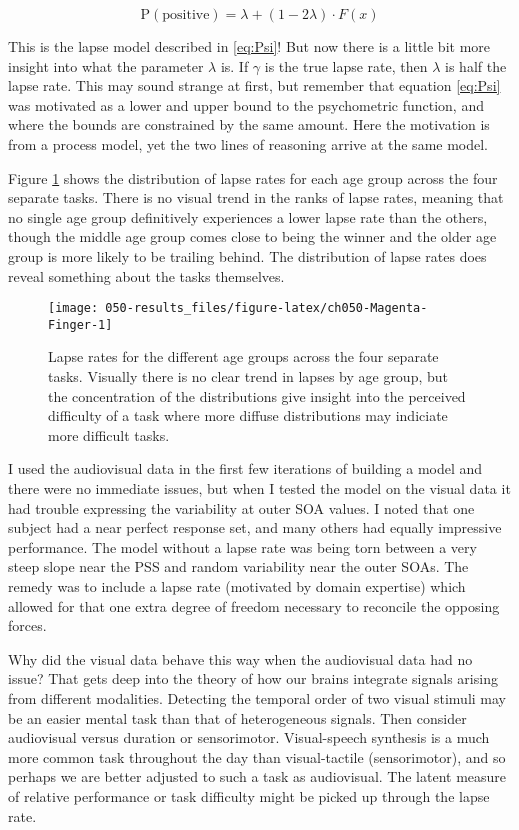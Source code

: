 \documentclass[11pt, oneside, openany]{scrbook}
\begin{document}
\[
\mathrm{P}(\textrm{positive}) = \lambda + (1 - 2\lambda) \cdot F(x)
\]

This is the lapse model described in \eqref{eq:Psi}! But now there is a little bit more insight into what the parameter \(\lambda\) is. If \(\gamma\) is the true lapse rate, then \(\lambda\) is half the lapse rate. This may sound strange at first, but remember that equation \eqref{eq:Psi} was motivated as a lower and upper bound to the psychometric function, and where the bounds are constrained by the same amount. Here the motivation is from a process model, yet the two lines of reasoning arrive at the same model.

Figure \ref{fig:ch050-Magenta-Finger} shows the distribution of lapse rates for each age group across the four separate tasks. There is no visual trend in the ranks of lapse rates, meaning that no single age group definitively experiences a lower lapse rate than the others, though the middle age group comes close to being the winner and the older age group is more likely to be trailing behind. The distribution of lapse rates does reveal something about the tasks themselves.

\begin{figure}

{\centering \texttt{[image: 050-results\_files/figure-latex/ch050-Magenta-Finger-1]} 

}

\caption{Lapse rates for the different age groups across the four separate tasks. Visually there is no clear trend in lapses by age group, but the concentration of the distributions give insight into the perceived difficulty of a task where more diffuse distributions may indiciate more difficult tasks.}\label{fig:ch050-Magenta-Finger}
\end{figure}

I used the audiovisual data in the first few iterations of building a model and there were no immediate issues, but when I tested the model on the visual data it had trouble expressing the variability at outer SOA values. I noted that one subject had a near perfect response set, and many others had equally impressive performance. The model without a lapse rate was being torn between a very steep slope near the PSS and random variability near the outer SOAs. The remedy was to include a lapse rate (motivated by domain expertise) which allowed for that one extra degree of freedom necessary to reconcile the opposing forces.

Why did the visual data behave this way when the audiovisual data had no issue? That gets deep into the theory of how our brains integrate signals arising from different modalities. Detecting the temporal order of two visual stimuli may be an easier mental task than that of heterogeneous signals. Then consider audiovisual versus duration or sensorimotor. Visual-speech synthesis is a much more common task throughout the day than visual-tactile (sensorimotor), and so perhaps we are better adjusted to such a task as audiovisual. The latent measure of relative performance or task difficulty might be picked up through the lapse rate.
\end{document}

